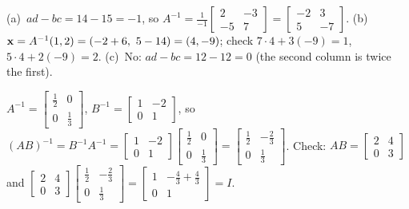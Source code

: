 \documentclass[11pt]{article}
\begin{document}
\begin{description}[leftmargin=0pt,itemsep=5pt]
  \item[Knowledge Check \ref{kc:formulakc}.] (a)~$ad-bc=14-15=-1$, so $A^{-1}=\frac1{-1}\begin{bmatrix}2&-3\\-5&7\end{bmatrix}=\begin{bmatrix}-2&3\\5&-7\end{bmatrix}$. (b)~$\bv{x}=A^{-1}(1,2)=(-2+6,\ 5-14)=(4,-9)$; check $7\cdot4+3(-9)=1$, \ $5\cdot4+2(-9)=2$. (c)~No: $ad-bc=12-12=0$ (the second column is twice the first).
  \item[Knowledge Check \ref{kc:prodinvkc}.] $A^{-1}=\begin{bmatrix}\tfrac12&0\\0&\tfrac13\end{bmatrix}$, $B^{-1}=\begin{bmatrix}1&-2\\0&1\end{bmatrix}$, so $(AB)^{-1}=B^{-1}A^{-1}=\begin{bmatrix}1&-2\\0&1\end{bmatrix}\begin{bmatrix}\tfrac12&0\\0&\tfrac13\end{bmatrix}=\begin{bmatrix}\tfrac12&-\tfrac23\\0&\tfrac13\end{bmatrix}$. Check: $AB=\begin{bmatrix}2&4\\0&3\end{bmatrix}$ and $\begin{bmatrix}2&4\\0&3\end{bmatrix}\begin{bmatrix}\tfrac12&-\tfrac23\\0&\tfrac13\end{bmatrix}=\begin{bmatrix}1&-\tfrac43+\tfrac43\\0&1\end{bmatrix}=I$.

\end{description}
\end{document}
